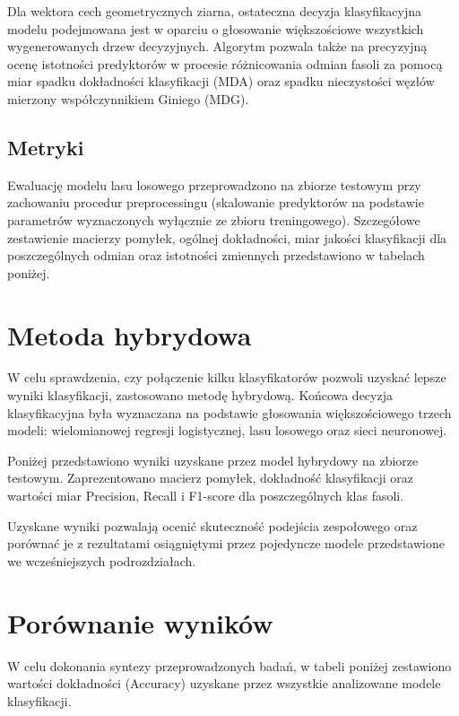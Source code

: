 \documentclass{report}
\begin{document}
Dla wektora cech geometrycznych ziarna, ostateczna decyzja klasyfikacyjna modelu podejmowana jest w oparciu o głosowanie większościowe wszystkich wygenerowanych drzew decyzyjnych. Algorytm pozwala także na precyzyjną ocenę istotności predyktorów w procesie różnicowania odmian fasoli za pomocą miar spadku dokładności klasyfikacji (MDA) oraz spadku nieczystości węzłów mierzony współczynnikiem Giniego (MDG).

\subsection*{Metryki}

Ewaluację modelu lasu losowego przeprowadzono na zbiorze testowym przy zachowaniu procedur preprocessingu (skalowanie predyktorów na podstawie parametrów wyznaczonych wyłącznie ze zbioru treningowego). Szczegółowe zestawienie macierzy pomyłek, ogólnej dokładności, miar jakości klasyfikacji dla poszczególnych odmian oraz istotności zmiennych przedstawiono w tabelach poniżej.




\section{Metoda hybrydowa}

W celu sprawdzenia, czy połączenie kilku klasyfikatorów pozwoli uzyskać lepsze wyniki klasyfikacji, zastosowano metodę hybrydową. Końcowa decyzja klasyfikacyjna była wyznaczana na podstawie głosowania większościowego trzech modeli: wielomianowej regresji logistycznej, lasu losowego oraz sieci neuronowej.

Poniżej przedstawiono wyniki uzyskane przez model hybrydowy na zbiorze testowym. Zaprezentowano macierz pomyłek, dokładność klasyfikacji oraz wartości miar Precision, Recall i F1-score dla poszczególnych klas fasoli.



Uzyskane wyniki pozwalają ocenić skuteczność podejścia zespołowego oraz porównać je z rezultatami osiągniętymi przez pojedyncze modele przedstawione we wcześniejszych podrozdziałach.

\section{Porównanie wyników}
W celu dokonania syntezy przeprowadzonych badań, w tabeli poniżej zestawiono wartości dokładności (Accuracy) uzyskane przez wszystkie analizowane modele klasyfikacji.

\end{document}
